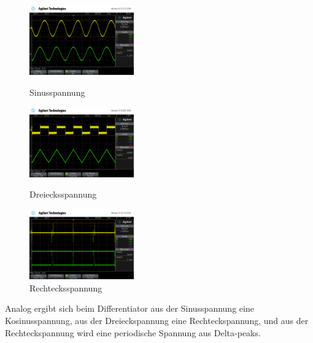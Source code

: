 \documentclass{scrartcl}
\begin{document}
\begin{figure}[H]
\centering
\includegraphics[width=0.4\textwidth]{aufnahmen_neu/scope_190.png}
\caption{Sinusspannung}
\label{verstaerker}

\includegraphics[width=0.4\textwidth]{aufnahmen_neu/scope_191.png}
\caption{Dreiecksspannung}
\label{verstaerker}

\includegraphics[width=0.4\textwidth]{aufnahmen_neu/scope_193.png}
\caption{Rechtecksspannung}
\label{verstaerker}
\end{figure}
\noindent
Analog ergibt sich beim Differentiator aus der Sinusspannung eine Kosinusspannung, aus der Dreieckspannung eine Rechteckspannung, und aus der Rechteckspannung wird eine periodische Spannung aus Delta-peaks.
\newpage
\end{document}
